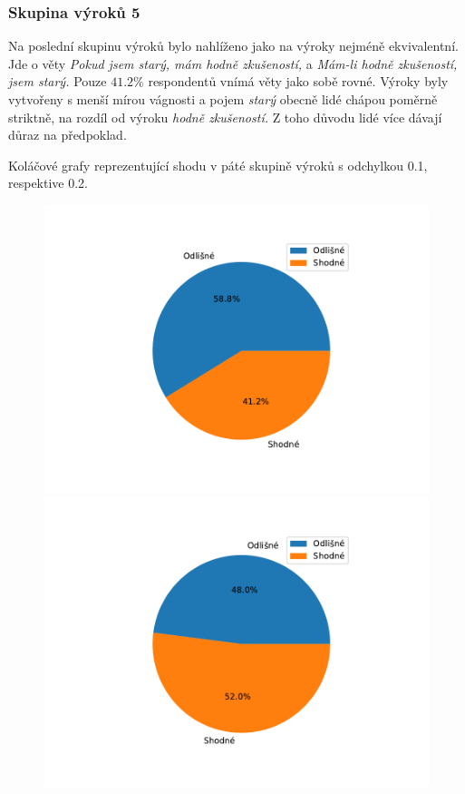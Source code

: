 \subsubsection{Skupina výrok\r u 5}
Na poslední skupinu výrok\r u bylo nahlíženo jako na výroky nejméně ekvivalentní. Jde o věty \textit{\clqq Pokud jsem starý, mám hodně zkušeností,\crqq }  \space a \textit{\clqq Mám-li hodně zkušeností, jsem starý.\crqq } \space Pouze $41.2 $\space$ \%$ respondent\r u vnímá věty jako sobě rovné. Výroky byly vytvořeny s menší mírou vágnosti a pojem \textit{\clqq starý\crqq } obecně lidé chápou poměrně striktně, na rozdíl od výroku \textit{\clqq hodně zkušeností. \crqq  \space} Z toho d\r uvodu lidé více dávají d\r uraz na předpoklad.
\begin{graph}
Koláčové grafy reprezentující shodu v páté skupině výrok\r u s odchylkou 0.1, respektive 0.2.
    \begin{figure}[H]
                \includegraphics[scale=0.5]{template-fig/group4.pdf}
                \includegraphics[scale=0.5]{template-fig/group44.pdf}
            \end{figure}
\end{graph}

